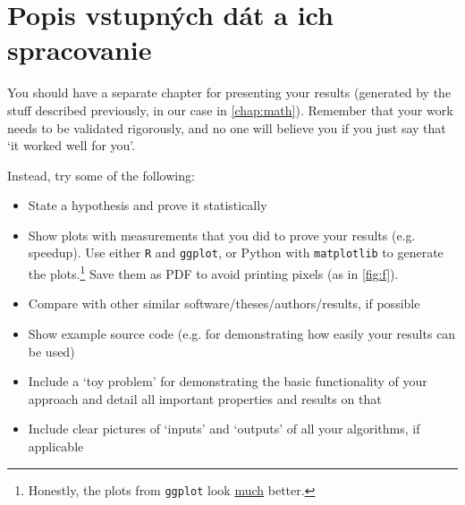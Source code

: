 \chapter{Popis vstupných dát a ich spracovanie}
\label{chap:ThirdChapter}
You should have a separate chapter for presenting your results (generated by the stuff described previously, in our case in \cref{chap:math}). Remember that your work needs to be validated rigorously, and no one will believe you if you just say that `it worked well for you'.

Instead, try some of the following:
\begin{itemize}
\item State a hypothesis and prove it statistically
\item Show plots with measurements that you did to prove your results (e.g. speedup). Use either \texttt{R} and \texttt{ggplot}, or Python with \texttt{matplotlib} to generate the plots.\footnote{Honestly, the plots from \texttt{ggplot} look \underline{much} better.} Save them as PDF to avoid printing pixels (as in \cref{fig:f}).
\item Compare with other similar software/theses/authors/results, if possible
\item Show example source code (e.g. for demonstrating how easily your results can be used)
\item Include a `toy problem' for demonstrating the basic functionality of your approach and detail all important properties and results on that
\item Include clear pictures of `inputs' and `outputs' of all your algorithms, if applicable
\end{itemize}



